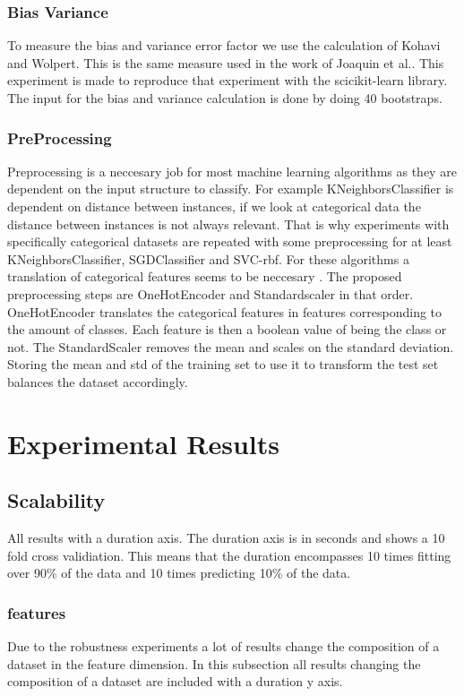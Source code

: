 \documentclass[a4paper,10pt]{article}
\begin{document}
\subsubsection{Bias Variance}
To measure the bias and variance error factor we use the calculation of Kohavi and Wolpert\cite{BiasCalc}. This is the same measure used in the work of Joaquin et al.\cite{Bias-var}. This experiment is made to reproduce that experiment with the scicikit-learn library. The input for the bias and variance calculation is done by doing 40 bootstraps. 

\subsubsection{PreProcessing}
Preprocessing is a neccesary job for most machine learning algorithms as they are dependent on the input structure to classify. For example KNeighborsClassifier is dependent on distance between instances, if we look at categorical data the distance between instances is not always relevant. That is why experiments with specifically categorical datasets are repeated with some preprocessing for at least KNeighborsClassifier, SGDClassifier and SVC-rbf. For these algorithms a translation of categorical features seems to be neccesary \cite{KNN-Sym}\cite{SVM-sym}. The proposed preprocessing steps are OneHotEncoder and Standardscaler in that order. OneHotEncoder translates the categorical features in features corresponding to the amount of classes. Each feature is then a boolean value of being the class or not. The StandardScaler removes the mean and scales on the standard deviation. Storing the mean and std of the training set to use it to transform the test set balances the dataset accordingly. 
\section{Experimental Results} \label{Chapter4}


\subsection{Scalability}
All results with a duration axis. The duration axis is in seconds and shows a 10 fold cross validiation. This means that the duration encompasses 10 times fitting over 90\% of the data and 10 times predicting 10\% of the data.

\subsubsection{features}
Due to the robustness experiments a lot of results change the composition of a dataset in the feature dimension. In this subsection all results changing the composition of a dataset are included with a duration y axis. 
\end{document}
